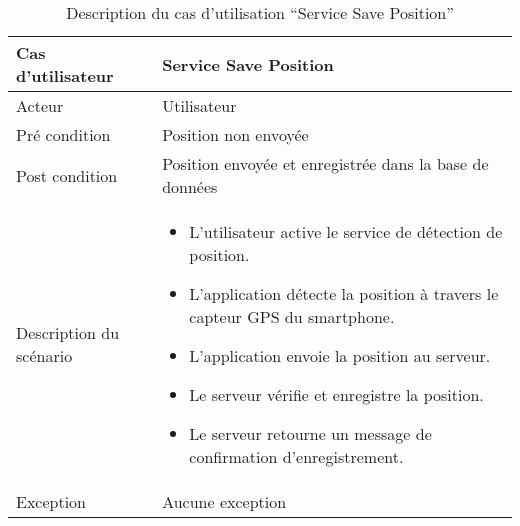 \begin{table}[H]
    \centering
    \begin{tabular}{| p{3cm} | l |}
        \hline
        Cas d'utilisateur & Service Save Position \\ \hline
        Acteur & Utilisateur \\ \hline
        Pré condition & Position non envoyée \\ \hline
        Post condition & Position envoyée et enregistrée dans la base de données \\ \hline
        Description du scénario &
        \begin{minipage}{11cm}
            \vspace*{0.2cm}
            \begin{itemize}
                \item L'utilisateur active le service de détection de position.
                \item L'application détecte la position à travers le capteur \acrshort{GPS} du smartphone.
                \item L'application envoie la position au serveur.
                \item Le serveur vérifie et enregistre la position.
                \item Le serveur retourne un message de confirmation d'enregistrement.
            \end{itemize}
        \end{minipage} \\ \hline
        Exception & Aucune exception \\ \hline
    \end{tabular}
    \caption{Description du cas d'utilisation ``Service Save Position''}
\end{table}

